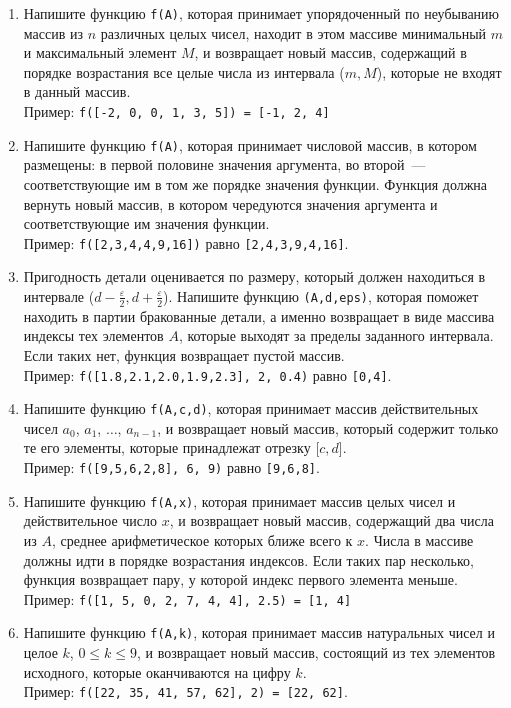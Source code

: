 \documentclass{article}
\begin{document}
\begin{enumerate}[label={}, leftmargin=0pt, itemindent=0pt]
\begin{enumerate}[label=\arabic{enumi}.\arabic*.]
\item 
Напишите функцию \texttt{f(A)}, которая принимает упорядоченный по неубыванию массив из $n$ различных целых чисел, находит в этом массиве минимальный $m$ и максимальный элемент $M$, и возвращает новый массив, содержащий в порядке возрастания все целые числа из интервала ($m, M$), которые не входят в данный массив.
\\Пример: \texttt{f([-2, 0, 0, 1, 3, 5]) = [-1, 2, 4]}

\item 
Напишите функцию \texttt{f(A)}, которая принимает числовой массив, в котором размещены: в первой половине значения аргумента, во второй~--- соответствующие им в том же порядке значения функции. Функция должна вернуть новый массив, в котором чередуются значения аргумента и соответствующие им значения функции.
\\Пример: \texttt{f([2,3,4,4,9,16])} равно \texttt{[2,4,3,9,4,16]}.

\item 
Пригодность детали оценивается по размеру, который должен находиться в интервале ($d - \frac{\varepsilon}{2}, d + \frac{\varepsilon}{2}$). Напишите функцию \texttt{(A,d,eps)}, которая поможет находить в партии бракованные детали, а именно возвращает в виде массива индексы тех элементов $A$, которые выходят за пределы заданного интервала.  Если таких нет, функция возвращает пустой массив.
\\Пример: \texttt{f([1.8,2.1,2.0,1.9,2.3],\,2,\,0.4)} равно \texttt{[0,4]}.

\item 
Напишите функцию \texttt{f(A,c,d)}, которая принимает массив действительных чисел $a_0$, $a_1$, $\ldots$, $a_{n-1}$, и возвращает новый массив, который содержит только те его элементы, которые принадлежат отрезку [$c, d$].
\\Пример: \texttt{f([9,5,6,2,8],\,6,\,9)} равно \texttt{[9,6,8]}.

\item 
Напишите функцию \texttt{f(A,x)}, которая принимает массив целых чисел и действительное число $x$, и возвращает новый массив, содержащий два числа из  $A$, среднее арифметическое которых ближе всего к $x$. Числа в массиве должны идти в порядке возрастания индексов. Если таких пар несколько, функция возвращает пару, у которой индекс первого элемента меньше. 
\\Пример: \texttt{f([1, 5, 0, 2, 7, 4, 4], 2.5) = [1, 4]}

\item 
Напишите функцию \texttt{f(A,k)}, которая принимает массив натуральных чисел и целое $k$,  $0\leqslant k \leqslant 9$, и возвращает новый массив, состоящий из тех элементов исходного, которые оканчиваются на цифру $k$.
\\Пример: \texttt{f([22, 35, 41, 57, 62], 2) = [22, 62]}.
\end{enumerate}




\end{enumerate}
\end{document}
